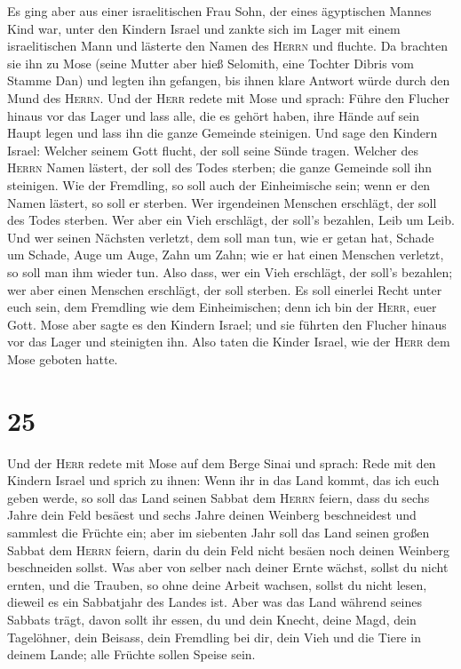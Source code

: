  Es ging aber aus einer israelitischen Frau Sohn, der
eines ägyptischen Mannes Kind war, unter den Kindern Israel und zankte
sich im Lager mit einem israelitischen Mann  und lästerte
den Namen des \textsc{Herrn} und fluchte. Da brachten sie ihn zu Mose
(seine Mutter aber hieß Selomith, eine Tochter Dibris vom Stamme Dan)
 und legten ihn gefangen, bis ihnen klare Antwort würde
durch den Mund des \textsc{Herrn}.  Und der \textsc{Herr}
redete mit Mose und sprach:  Führe den Flucher hinaus vor
das Lager und lass alle, die es gehört haben, ihre Hände auf sein Haupt
legen und lass ihn die ganze Gemeinde steinigen.  Und
sage den Kindern Israel: Welcher seinem Gott flucht, der soll seine
Sünde tragen.  Welcher des \textsc{Herrn} Namen lästert,
der soll des Todes sterben; die ganze Gemeinde soll ihn steinigen. Wie
der Fremdling, so soll auch der Einheimische sein; wenn er den Namen
lästert, so soll er sterben.  Wer irgendeinen Menschen
erschlägt, der soll des Todes sterben.  Wer aber ein Vieh
erschlägt, der soll's bezahlen, Leib um Leib.  Und wer
seinen Nächsten verletzt, dem soll man tun, wie er getan hat,
 Schade um Schade, Auge um Auge, Zahn um Zahn; wie er hat
einen Menschen verletzt, so soll man ihm wieder tun. 
Also dass, wer ein Vieh erschlägt, der soll's bezahlen; wer aber einen
Menschen erschlägt, der soll sterben.  Es soll einerlei
Recht unter euch sein, dem Fremdling wie dem Einheimischen; denn ich bin
der \textsc{Herr}, euer Gott.  Mose aber sagte es den
Kindern Israel; und sie führten den Flucher hinaus vor das Lager und
steinigten ihn. Also taten die Kinder Israel, wie der \textsc{Herr} dem
Mose geboten hatte.

\hypertarget{section-24}{%
\section{25}\label{section-24}}

 Und der \textsc{Herr} redete mit Mose auf dem Berge Sinai
und sprach:  Rede mit den Kindern Israel und sprich zu
ihnen: Wenn ihr in das Land kommt, das ich euch geben werde, so soll das
Land seinen Sabbat dem \textsc{Herrn} feiern,  dass du
sechs Jahre dein Feld besäest und sechs Jahre deinen Weinberg
beschneidest und sammlest die Früchte ein;  aber im
siebenten Jahr soll das Land seinen großen Sabbat dem \textsc{Herrn}
feiern, darin du dein Feld nicht besäen noch deinen Weinberg beschneiden
sollst.  Was aber von selber nach deiner Ernte wächst,
sollst du nicht ernten, und die Trauben, so ohne deine Arbeit wachsen,
sollst du nicht lesen, dieweil es ein Sabbatjahr des Landes ist.
 Aber was das Land während seines Sabbats trägt, davon
sollt ihr essen, du und dein Knecht, deine Magd, dein Tagelöhner, dein
Beisass, dein Fremdling bei dir,  dein Vieh und die Tiere
in deinem Lande; alle Früchte sollen Speise sein.

